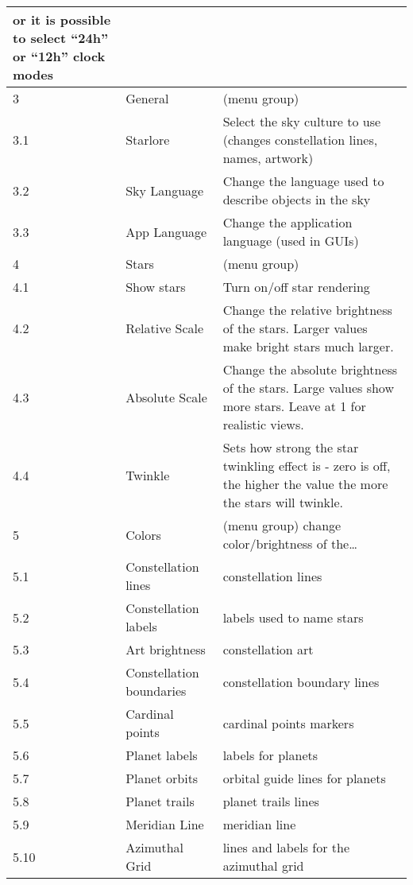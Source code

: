 \begin{longtable}{l|p{45mm}|p{85mm}}
                            or it is possible to select ``24h'' or ``12h'' clock modes\\\midrule
3    & General      & (menu group)\\%
3.1  & Starlore     & Select the sky culture to use (changes constellation lines, names, artwork)\\%
3.2  & Sky Language & Change the language used to describe objects in the sky\\%
3.3  & App Language & Change the application language (used in GUIs) \\\midrule
4    & Stars          & (menu group)\\%
4.1  & Show stars     & Turn on/off star rendering\\%
4.2  & Relative Scale & Change the relative brightness of the stars. Larger values make bright stars much larger.\\%
4.3  & Absolute Scale & Change the absolute brightness of the stars. Large values show more stars. Leave at 1 for realistic views. \\%
4.4  & Twinkle        & Sets how strong the star twinkling effect is - zero is off, the higher the value the more the stars will twinkle.\\\midrule
5    & Colors                      & (menu group) change color/brightness of the\ldots\\%
5.1  & Constellation lines         & constellation lines\\%
5.2  & Constellation labels        & labels used to name stars\\%
5.3  & Art brightness              & constellation art\\%
5.4  & Constellation boundaries    & constellation boundary lines\\%
5.5  & Cardinal points             & cardinal points markers\\%
5.6  & Planet labels               & labels for planets\\%
5.7  & Planet orbits               & orbital guide lines for planets\\%
5.8  & Planet trails               & planet trails lines\\%
5.9  & Meridian Line               & meridian line\\%
5.10 & Azimuthal Grid              & lines and labels for the azimuthal grid\\%

\end{longtable}
